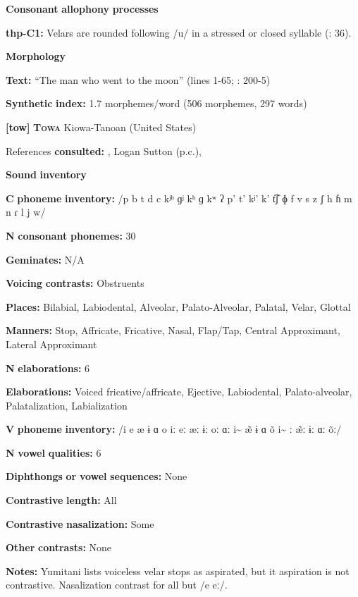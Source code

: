 \textbf{Consonant} \textbf{allophony} \textbf{processes}

\textbf{thp-C1:} Velars are rounded following /u/ in a stressed or closed syllable (\citealt{ThompsonThompson1992}: 36).

\textbf{Morphology}

\textbf{Text:} “The man who went to the moon” (lines 1-65; \citealt{ThompsonThompson1992}: 200-5)

\textbf{Synthetic} \textbf{index:} 1.7 morphemes/word (506 morphemes, 297 words)

\textbf{[tow]}   \textbf{\textsc{Towa}  }  Kiowa-Tanoan (United States)

References \textbf{consulted:} \citet{Bell1993}, Logan Sutton (p.c.), \citet{Yumitani1998}

\textbf{Sound} \textbf{inventory}

\textbf{C} \textbf{phoneme} \textbf{inventory:} /p b t d c kʲʰ ɡʲ kʰ ɡ kʷ ʔ p’ t’ kʲ’ k’ t͡ʃ ɸ f v s z ʃ h ɦ m n ɾ l j w/

\textbf{N} \textbf{consonant} \textbf{phonemes:} 30

\textbf{Geminates:} N/A

\textbf{Voicing} \textbf{contrasts:} Obstruents

\textbf{Places:} Bilabial, Labiodental, Alveolar, Palato-Alveolar, Palatal, Velar, Glottal

\textbf{Manners:} Stop, Affricate, Fricative, Nasal, Flap/Tap, Central Approximant, Lateral Approximant

\textbf{N} \textbf{elaborations:} 6

\textbf{Elaborations:} Voiced fricative/affricate, Ejective, Labiodental, Palato-alveolar, Palatalization, Labialization

\textbf{V} \textbf{phoneme} \textbf{inventory:} /i e æ ɨ ɑ o iː eː æː ɨː oː ɑː i\~{}  \~{æ} ɨ ɑ õ i\~{} ː \~{æ}ː ɨː ɑː õː/

\textbf{N} \textbf{vowel} \textbf{qualities:} 6

\textbf{Diphthongs} \textbf{or} \textbf{vowel} \textbf{sequences:} None

\textbf{Contrastive} \textbf{length:} All

\textbf{Contrastive} \textbf{nasalization:} Some

\textbf{Other} \textbf{contrasts:} None

\textbf{Notes:} Yumitani lists voiceless velar stops as aspirated, but it aspiration is not contrastive. Nasalization contrast for all but /e eː/.

